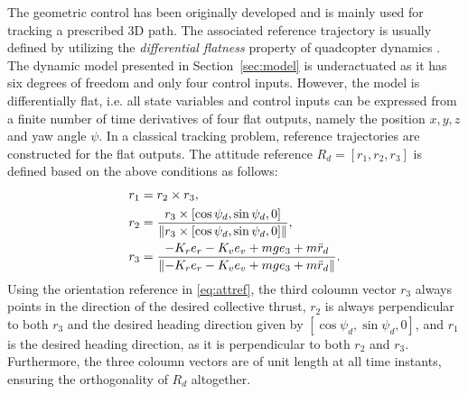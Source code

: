 The geometric control has been originally developed and is mainly used for tracking a prescribed 3D path. The associated reference trajectory is usually defined by utilizing the \textit{differential flatness} property of quadcopter dynamics \cite{flatness}. The dynamic model presented in Section~\ref{sec:model} is underactuated as it has six degrees of freedom and only four control inputs. However, the model is differentially flat, i.e. all state variables and control inputs can be expressed from a finite number of time derivatives of four flat outputs, namely the position $x,y,z$ and yaw angle $\psi$.  In a classical tracking problem, reference trajectories are constructed for the flat outputs. The attitude reference $R_d=[r_1, r_2, r_3]$ is defined based on the above conditions as follows:
\begin{subequations}\label{eq:attref}
\begin{align}
    r_1 &= r_2\times r_3,\\
    r_2 &= \frac{r_3\times [\cos\psi_d, \sin\psi_d, 0]}{\norm{r_3\times [\cos\psi_d, \sin\psi_d, 0]}},\\
    r_3 &= \frac{-K_r e_r - K_v e_v + m g e_3+m \ddot r_d}{\norm{-K_r e_r - K_v e_v + m g e_3+m \ddot r_d}}.
\end{align}
\end{subequations}
Using the orientation reference in \eqref{eq:attref}, the third coloumn vector $r_3$ always points in the direction of the desired collective thrust, $r_2$ is always perpendicular to both $r_3$ and the desired heading direction given by $[\cos\psi_d, \sin\psi_d, 0]$, and $r_1$ is the desired heading direction, as it is perpendicular to both $r_2$ and $r_3$. Furthermore, the three coloumn vectors are of unit length at all time instants, ensuring the orthogonality of $R_d$ altogether.

